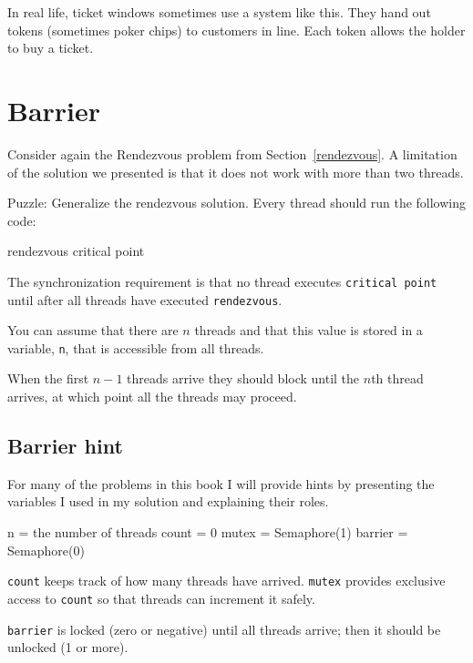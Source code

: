 \documentclass{book}
\begin{document}
In real life, ticket windows sometimes use a system like
this.  They hand out tokens (sometimes poker chips) to
customers in line.  Each token allows the holder to buy a ticket.




\section{Barrier}

Consider again the Rendezvous problem from Section~\ref{rendezvous}.
A limitation of the solution we presented is that it does
not work with more than two threads.

Puzzle: Generalize the rendezvous solution.  Every thread should
run the following code:
\begin{unbreakable}[title={Barrier code}]{}
rendezvous
critical point
\end{unbreakable}

The synchronization requirement is that
no thread executes {\tt critical point} until after all
threads have executed {\tt rendezvous}.

You can assume that there are $n$
threads and that this value is stored in a variable, {\tt n},
that is accessible from all threads.

When the first $n-1$ threads arrive they should block until the $n$th
thread arrives, at which point all the threads may proceed.



\subsection {Barrier hint}

For many of the problems in this book I will provide hints
by presenting the variables I used in my solution and
explaining their roles.

\begin{unbreakable}[title={Barrier hint}]{}
n = the number of threads
count = 0
mutex = Semaphore(1)
barrier = Semaphore(0)
\end{unbreakable}

{\tt count} keeps track of how many threads have arrived.
    {\tt mutex} provides exclusive access to {\tt count} so that
threads can increment it safely.

    {\tt barrier} is locked
(zero or negative) until all threads arrive; then it should
be unlocked (1 or more).
\end{document}
